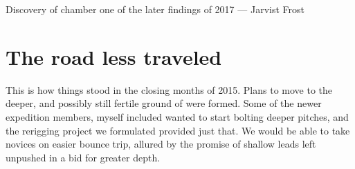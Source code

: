 	\begin{marginfigure}
	\checkoddpage \ifoddpage \forcerectofloat \else \forceversofloat \fi
	\centering
  	\caption{Discovery of \protect{} chamber one of the later findings of 2017 --- Jarvist Frost}
	\end{marginfigure}

\section{The road less traveled}
This is how things stood in the closing months of 2015. Plans to move to the deeper, and possibly still fertile ground of  were formed. Some of the newer expedition members, myself included wanted to start bolting deeper pitches, and the rerigging project we formulated provided just that. We would be able to take novices on easier bounce trip, allured by the promise of shallow leads left unpushed in a bid for greater depth.

